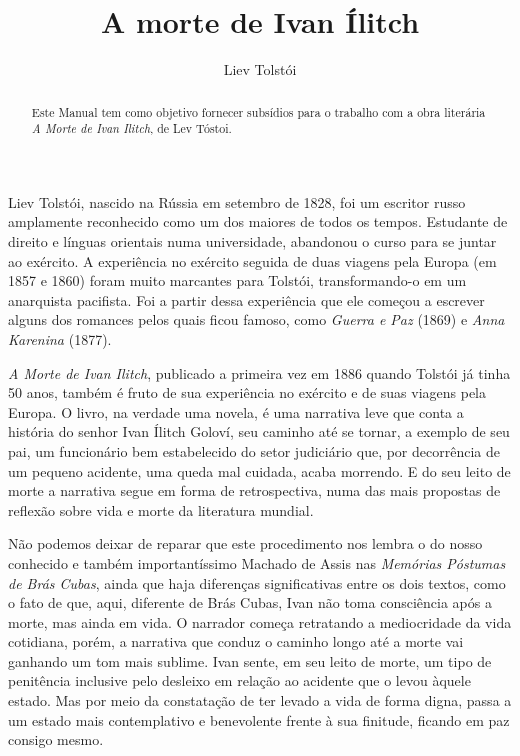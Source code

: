 \documentclass[12pt]{extarticle}
\begin{document}
\newcommand{\AutorLivro}{Liev Tolstói}
\newcommand{\TituloLivro}{A morte de Ivan Ílitch}
\newcommand{\Tema}{Ficção, mistério e fantasia}
\newcommand{\Genero}{Romance}
\newcommand{\imagemCapa}{./images/PNLD0042-01.png}
\newcommand{\issnppub}{---}
\newcommand{\issnepub}{---}
\newcommand{\colaborador}{\textbf{Bruno Gradella e Vicente Castro} é uma pessoa incrível e vai fazer um bom serviço.}


\title{\TituloLivro}
\author{\AutorLivro}
\def\authornotes{\colaborador}

\date{}
\maketitle

\baselineskip\par


\begin{abstract}
Este Manual tem como objetivo fornecer subsídios para o trabalho com a
obra literária \emph{A Morte de Ivan Ilitch}, de Lev Tóstoi.
\end{abstract}

Liev Tolstói, nascido na Rússia em setembro de 1828, foi um escritor russo amplamente 
reconhecido como um dos maiores de todos os tempos. Estudante de direito e línguas 
orientais numa universidade, abandonou o curso para se juntar ao exército. 
A experiência no exército seguida de duas viagens pela Europa (em 1857 e 1860) 
foram muito marcantes para Tolstói, transformando-o em um anarquista pacifista. 
Foi a partir dessa experiência que ele começou a escrever alguns dos romances 
pelos quais ficou famoso, como \textit{Guerra e Paz} (1869) e \textit{Anna Karenina} (1877). 
 
\textit{A Morte de Ivan Ilitch}, publicado a primeira vez em 1886 quando 
Tolstói já tinha 50 anos, também é fruto de sua experiência no exército 
e de suas viagens pela Europa. O livro, na verdade uma novela, é uma narrativa 
leve que conta a história do senhor Ivan Ílitch Goloví, seu caminho até se tornar,
a exemplo de seu pai, um funcionário bem estabelecido do setor judiciário que, 
por decorrência de um pequeno acidente, uma queda mal cuidada, acaba morrendo. 
E do seu leito de morte a narrativa segue em forma de retrospectiva, numa das mais
propostas de reflexão sobre vida e morte da literatura mundial.

Não podemos deixar de reparar que este procedimento nos lembra o do nosso conhecido
e também importantíssimo Machado de Assis nas \textit{Memórias Póstumas de Brás Cubas},
ainda que haja diferenças significativas entre os dois textos, como o fato de que, aqui,
diferente de Brás Cubas, Ivan não toma consciência após a morte, mas ainda em vida. 
O narrador começa retratando a mediocridade da vida cotidiana, porém, a narrativa 
que conduz o caminho longo até a morte vai ganhando um tom mais sublime. 
Ivan sente, em seu leito de morte, um tipo de penitência inclusive pelo 
desleixo em relação ao acidente que o levou àquele estado. Mas por meio da 
constatação de ter levado a vida de forma digna, passa a um estado mais 
contemplativo e benevolente frente à sua finitude, ficando em paz consigo mesmo.
\end{document}
